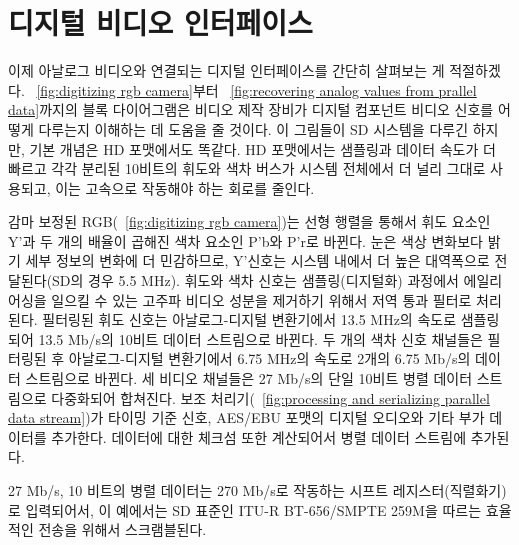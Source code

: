 \chapter{디지털 비디오 인터페이스}
이제 아날로그 비디오와 연결되는 디지털 인터페이스를 간단히 살펴보는 게 적절하겠다.
\figurename~\ref{fig:digitizing rgb camera}부터 \figurename~\ref{fig:recovering analog values from prallel data}까지의 블록 다이어그램은 비디오 제작 장비가 디지털 컴포넌트 비디오 신호를 어떻게 다루는지 이해하는 데 도움을 줄 것이다.
이 그림들이 SD 시스템을 다루긴 하지만, 기본 개념은 HD 포맷에서도 똑같다. HD 포맷에서는 샘플링과 데이터 속도가 더 빠르고 각각 분리된 10비트의 휘도와 색차 버스가 시스템 전체에서 더 널리 그대로 사용되고, 이는 고속으로 작동해야 하는 회로를 줄인다.


감마 보정된 RGB(\figurename~\ref{fig:digitizing rgb camera})는 선형 행렬을 통해서 휘도 요소인 Y'과 두 개의 배율이 곱해진 색차 요소인 P'b와 P'r로 바뀐다.
눈은 색상 변화보다 밝기 세부 정보의 변화에 더 민감하므로, Y'신호는 시스템 내에서 더 높은 대역폭으로 전달된다(SD의 경우 5.5 MHz).
휘도와 색차 신호는 샘플링(디지털화) 과정에서 에일리어싱을 일으킬 수 있는 고주파 비디오 성분을 제거하기 위해서 저역 통과 필터로 처리된다.
필터링된 휘도 신호는 아날로그-디지털 변환기에서 13.5 MHz의 속도로 샘플링되어 13.5 Mb/s의 10비트 데이터 스트림으로 바뀐다.
두 개의 색차 신호 채널들은 필터링된 후 아날로그-디지털 변환기에서 6.75 MHz의 속도로 2개의 6.75 Mb/s의 데이터 스트림으로 바뀐다.
세 비디오 채널들은 27 Mb/s의 단일 10비트 병렬 데이터 스트림으로 다중화되어 합쳐진다.
보조 처리기(\figurename~\ref{fig:processing and serializing parallel data stream})가 타이밍 기준 신호, AES/EBU 포맷의 디지털 오디오와 기타 부가 데이터를 추가한다. 데이터에 대한 체크섬 또한 계산되어서 병렬 데이터 스트림에 추가된다.


27 Mb/s, 10 비트의 병렬 데이터는 270 Mb/s로 작동하는 시프트 레지스터(직렬화기)로 입력되어서, 이 예에서는 SD 표준인 ITU-R BT-656/SMPTE 259M을 따르는 효율적인 전송을 위해서 스크램블된다.


